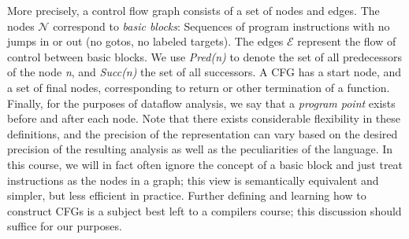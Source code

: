\documentclass[11pt]{article}
\begin{document}
More precisely, a control flow graph consists of a set of nodes and edges. The
nodes $\mathcal{N}$ correspond to \textit{basic blocks}: Sequences of program
instructions with no jumps in or out (no gotos, no labeled targets).  The edges
$\mathcal{E}$ represent the flow of control between basic blocks.  We use
\textit{Pred(n)} to denote the set of all predecessors of the node \textit{n},
and \textit{Succ(n)} the set of all successors.  A CFG has a start node, and a
set of final nodes, corresponding to return or other termination of a function.
Finally, for the purposes of dataflow analysis, we say that a \emph{program
  point} exists before and after each node.  Note that there exists considerable
flexibility in these definitions, and the precision of the representation can
vary based on the desired precision of the resulting analysis as well as the
peculiarities of the language.  In this course, we will in fact often ignore the
concept of a basic block and just treat instructions as the nodes in a graph; this
view is semantically equivalent and simpler, but less efficient in practice.
Further defining and learning how to construct
CFGs is a subject best left to a compilers course; this discussion should suffice
for our purposes.
\end{document}

